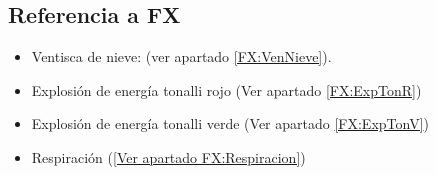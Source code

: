         \subsection{Referencia a FX}
\begin{itemize} 
        \item Ventisca de nieve: (ver apartado \ref{FX:VenNieve}).
        \item Explosión de energía tonalli rojo (Ver apartado \ref{FX:ExpTonR})
	\item Explosión de energía tonalli verde (Ver apartado \ref{FX:ExpTonV})
	\item Respiración (\ref{Ver apartado FX:Respiracion}) 
\end{itemize} 